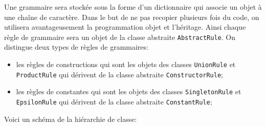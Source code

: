 \documentclass[11pt]{article}
\begin{document}
Une grammaire sera stockée sous la forme d'un dictionnaire qui associe un
objet à une chaîne de caractère. Dans le but de ne pas recopier plusieurs fois
du code, on utilisera avantageusement la programmation objet et
l'héritage. Ainsi chaque règle de grammaire sera un objet de la classe
abstraite \texttt{AbstractRule}. On distingue deux types de règles de
grammaires:\smallskip

\begin{itemize}
\item les règles de constructions qui sont les objets des classes
  \texttt{UnionRule} et \texttt{ProductRule} qui dérivent de la classe abstraite
  \texttt{ConstructorRule};\smallskip

\item les règles de constantes qui sont les objets des classes
  \texttt{SingletonRule} et \texttt{EpsilonRule} qui dérivent de la classe abstraite
  \texttt{ConstantRule};
\end{itemize}
\bigskip

Voici un schéma de la
hiérarchie de classe: \bigskip

\begin{center}
\end{center}
\smallskip
\end{document}
